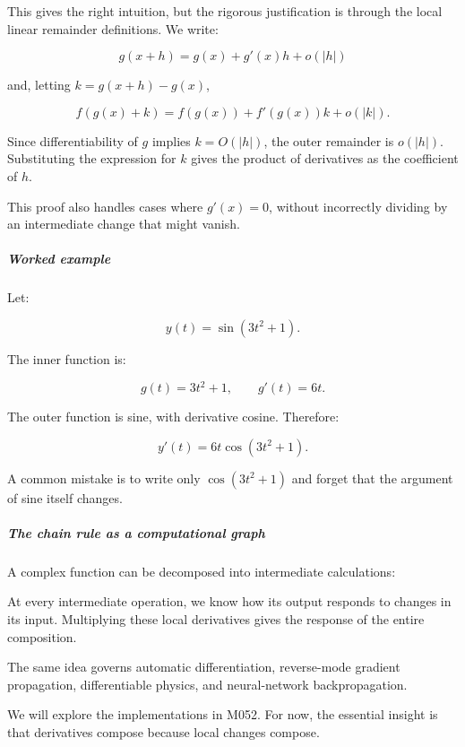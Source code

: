 This gives the right intuition, but the rigorous justification is through the local linear remainder definitions. We write:

\[
g(x+h)=g(x)+g'(x)h+o(|h|)
\]

and, letting \(k=g(x+h)-g(x)\),

\[
f(g(x)+k)=f(g(x))+f'(g(x))k+o(|k|).
\]

Since differentiability of \(g\) implies \(k=O(|h|)\), the outer remainder is \(o(|h|)\). Substituting the expression for \(k\) gives the product of derivatives as the coefficient of \(h\).

This proof also handles cases where \(g'(x)=0\), without incorrectly dividing by an intermediate change that might vanish.

\begin{allmightroleexample}

\subparagraph{Worked example}\label{01-foundations-i-ch020-worked-example}

\hypertarget{01-foundations-i-ch020-worked-example}{}

Let:

\end{allmightroleexample}

\[
y(t)=\sin(3t^2+1).
\]

The inner function is:

\[
g(t)=3t^2+1,\qquad g'(t)=6t.
\]

The outer function is sine, with derivative cosine. Therefore:

\[
\boxed{y'(t)=6t\cos(3t^2+1)}.
\]

A common mistake is to write only \(\cos(3t^2+1)\) and forget that the argument of sine itself changes.

\subparagraph{The chain rule as a computational graph}\label{01-foundations-i-ch020-the-chain-rule-as-a-computational-graph}

\hypertarget{01-foundations-i-ch020-the-chain-rule-as-a-computational-graph}{}

A complex function can be decomposed into intermediate calculations:

At every intermediate operation, we know how its output responds to changes in its input. Multiplying these local derivatives gives the response of the entire composition.

The same idea governs automatic differentiation, reverse-mode gradient propagation, differentiable physics, and neural-network backpropagation.

We will explore the implementations in M052. For now, the essential insight is that derivatives compose because local changes compose.

